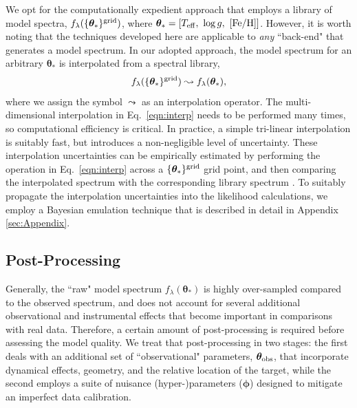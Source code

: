 \documentclass[iop,floatfix,numberedappendix,twocolappendix]{emulateapj}
\newcommand{\flam}{f_\lambda}
\newcommand{\vt}{ {\bm \theta}}
\newcommand{\vp}{ {\bm \phi}}
\begin{document}
We opt for the computationally expedient approach that employs a library of model spectra, 
$\flam(\{\vt_{\ast}\}^{\rm grid})$, where $\vt_{\ast} = [T_{\rm eff}, \,\, \log{g}, \,\, 
[{\rm Fe/H}]]$.  However, it is worth noting that the techniques developed here are applicable to 
{\it any} ``back-end" that generates a model spectrum.  In our adopted approach, the model spectrum 
for an arbitrary $\vt_{\ast}$ is interpolated from a spectral library,
\begin{equation} \label{eqn:interp} 
\flam(\{\vt_{\ast}\}^{\rm grid}) \leadsto \flam(\vt_{\ast}), 
\end{equation} 
where we assign the symbol $\leadsto$ as an interpolation operator.  The multi-dimensional 
interpolation in Eq.~\ref{eqn:interp} needs to be performed many times, so computational efficiency 
is critical.  In practice, a simple tri-linear interpolation is suitably fast, but introduces a 
non-negligible level of uncertainty.  These interpolation uncertainties can be empirically 
estimated by performing the operation in Eq.~\ref{eqn:interp} across a $\{\vt_{\ast}\}^{\rm grid}$ 
grid point, and then comparing the interpolated spectrum with the corresponding library spectrum 
\citep[see also][]{husser12}.  To suitably propagate the interpolation uncertainties into the 
likelihood calculations, we employ a Bayesian emulation technique that is described in detail in 
Appendix \ref{sec:Appendix}.


\subsection{Post-Processing} \label{subsec:postprocess}

Generally, the ``raw" model spectrum $\flam(\vt_{\ast})$ is highly over-sampled compared to the 
observed spectrum, and does not account for several additional observational and instrumental 
effects that become important in comparisons with real data.  Therefore, a certain amount of 
post-processing is required before assessing the model quality.  We treat that post-processing in 
two stages: the first deals with an additional set of ``observational" parameters, $\vt_{\rm obs}$, 
that incorporate dynamical effects, geometry, and the relative location of the target, while the 
second employs a suite of nuisance (hyper-)parameters ($\vp$) designed to mitigate an imperfect 
data calibration.
\end{document}
